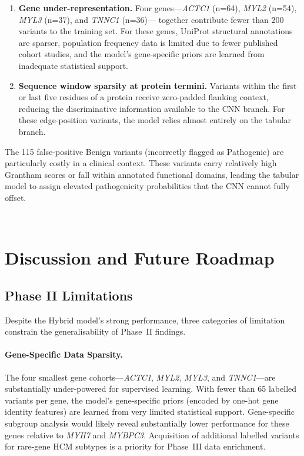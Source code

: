 \documentclass[12pt,a4paper]{article}
\begin{document}
\begin{enumerate}
\item \textbf{Gene under-representation.} Four genes—\textit{ACTC1} (n=64),
  \textit{MYL2} (n=54), \textit{MYL3} (n=37), and \textit{TNNC1} (n=36)—
  together contribute fewer than 200 variants to the training set.
  For these genes, UniProt structural annotations are sparser, population
  frequency data is limited due to fewer published cohort studies, and the
  model's gene-specific priors are learned from inadequate statistical
  support.

\item \textbf{Sequence window sparsity at protein termini.} Variants
  within the first or last five residues of a protein receive zero-padded
  flanking context, reducing the discriminative information available to
  the CNN branch. For these edge-position variants, the model relies almost
  entirely on the tabular branch.
\end{enumerate}
The 115 false-positive Benign variants (incorrectly flagged as Pathogenic)
are particularly costly in a clinical context. These variants carry
relatively high Grantham scores or fall within annotated functional domains,
leading the tabular model to assign elevated pathogenicity probabilities that
the CNN cannot fully offset.

\

\section{Discussion and Future Roadmap}
\label{sec:discussion}

\subsection{Phase II Limitations}
\label{subsec:limits}

Despite the Hybrid model's strong performance, three categories of limitation
constrain the generalisability of Phase~II findings.

\paragraph{Gene-Specific Data Sparsity.}
The four smallest gene cohorts—\textit{ACTC1}, \textit{MYL2},
\textit{MYL3}, and \textit{TNNC1}—are substantially under-powered for
supervised learning. With fewer than 65 labelled variants per gene, the
model's gene-specific priors (encoded by one-hot gene identity features)
are learned from very limited statistical support. Gene-specific subgroup
analysis would likely reveal substantially lower performance for these genes
relative to \textit{MYH7} and \textit{MYBPC3}. Acquisition of additional
labelled variants for rare-gene HCM subtypes is a priority for Phase~III
data enrichment.
\end{document}
